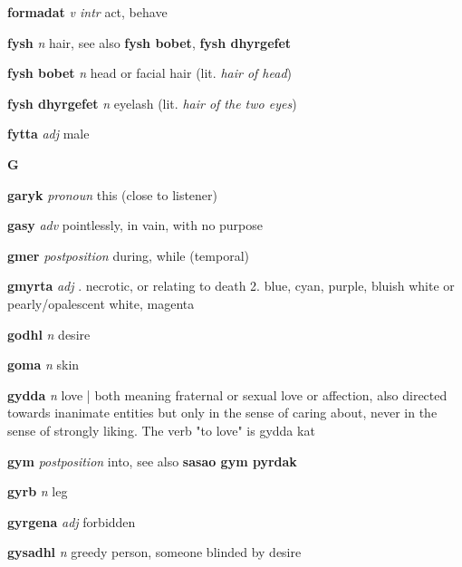 \textbf{formadat}   \emph{v intr} \textperiodcentered act, behave

\textbf{fysh}   \emph{n} \textperiodcentered hair, see also \textbf{fysh bobet}, \textbf{fysh dhyrgefet}

\textbf{fysh bobet}   \emph{n} \textperiodcentered head or facial hair (lit. \emph{hair of head})

\textbf{fysh dhyrgefet}   \emph{n} \textperiodcentered eyelash (lit. \emph{hair of the two eyes})

\textbf{fytta}   \emph{adj} \textperiodcentered male

\begin{center} \Huge \bfseries G \end{center}\textbf{garyk}   \emph{pronoun} \textperiodcentered this (close to listener)

\textbf{gasy}   \emph{adv} \textperiodcentered pointlessly, in vain, with no purpose

\textbf{gmer}   \emph{postposition} \textperiodcentered during, while (temporal)

\textbf{gmyrta}   \emph{adj} . necrotic, or relating to death 2. blue, cyan, purple, bluish white or pearly/opalescent white, magenta 

\textbf{godhl}   \emph{n} \textperiodcentered desire

\textbf{goma}   \emph{n} \textperiodcentered skin

\textbf{gydda}   \emph{n} \textperiodcentered love | both meaning fraternal or sexual love or affection, also directed towards inanimate entities but only in the sense of caring about, never in the sense of strongly liking. The verb "to love" is gydda kat

\textbf{gym}   \emph{postposition} \textperiodcentered into, see also \textbf{sasao gym pyrdak}

\textbf{gyrb}   \emph{n} \textperiodcentered leg

\textbf{gyrgena}   \emph{adj} \textperiodcentered forbidden

\textbf{gysadhl}   \emph{n} \textperiodcentered greedy person, someone blinded by desire

